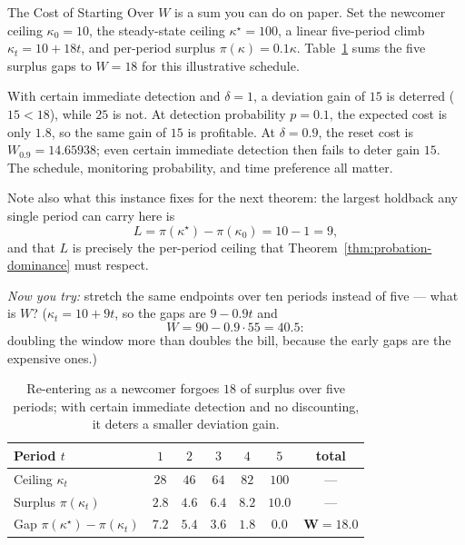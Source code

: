 \documentclass[11pt,a4paper]{article}
\theoremstyle{definition}
\begin{document}
\begin{pdexample}{The Cost of Starting Over}
\setlength{\parskip}{4pt plus 1pt}
\label{ex:maturation-cost}
$W$ is a sum you can do on paper. Set the
newcomer ceiling $\kappa_0=10$, the steady-state ceiling $\kappa^\star=100$, a
linear five-period climb $\kappa_t = 10 + 18t$, and per-period surplus
$\pi(\kappa)=0.1\kappa$. Table~\ref{tab:whitewash-numbers} sums the five
surplus gaps to $W=18$ for this illustrative schedule.

With certain immediate detection and $\delta=1$, a deviation gain of
$15$ is deterred ($15<18$), while $25$ is not. At detection probability
$p=0.1$, the expected cost is only $1.8$, so the same gain of $15$ is
profitable. At $\delta=0.9$, the reset cost is $W_{0.9}=14.65938$;
even certain immediate detection then fails to deter gain $15$.
The schedule, monitoring probability, and time preference all matter.

Note also what this
instance fixes for the next theorem: the largest holdback any single period can
carry here is
\[
L=\pi(\kappa^\star)-\pi(\kappa_0)=10-1=9,
\]
and that $L$ is precisely
the per-period ceiling that Theorem~\ref{thm:probation-dominance} must respect.

\emph{Now you try:} stretch the same endpoints over ten periods instead of five ---
what is $W$? ($\kappa_t=10+9t$, so the gaps are $9-0.9t$ and
\[
W=90-0.9\cdot 55=40.5:
\]
doubling the window more than doubles the bill, because
the early gaps are the expensive ones.)
\end{pdexample}


\begin{table}[H]
\centering\small\renewcommand{\arraystretch}{1.25}
\begin{tabular}{@{}l c c c c c c@{}}
\toprule
Period $t$ & $1$ & $2$ & $3$ & $4$ & $5$ & \textbf{total} \\
\midrule
Ceiling $\kappa_t$ & $28$ & $46$ & $64$ & $82$ & $100$ & --- \\
Surplus $\pi(\kappa_t)$ & $2.8$ & $4.6$ & $6.4$ & $8.2$ & $10.0$ & --- \\
Gap $\pi(\kappa^\star)-\pi(\kappa_t)$ & $7.2$ & $5.4$ & $3.6$ & $1.8$ & $0.0$ & $\mathbf{W=18.0}$ \\
\bottomrule
\end{tabular}
\caption{Re-entering as a newcomer forgoes $18$ of surplus over five periods;
with certain immediate detection and no discounting, it deters a smaller deviation gain.}
\label{tab:whitewash-numbers}
\end{table}
\end{document}
